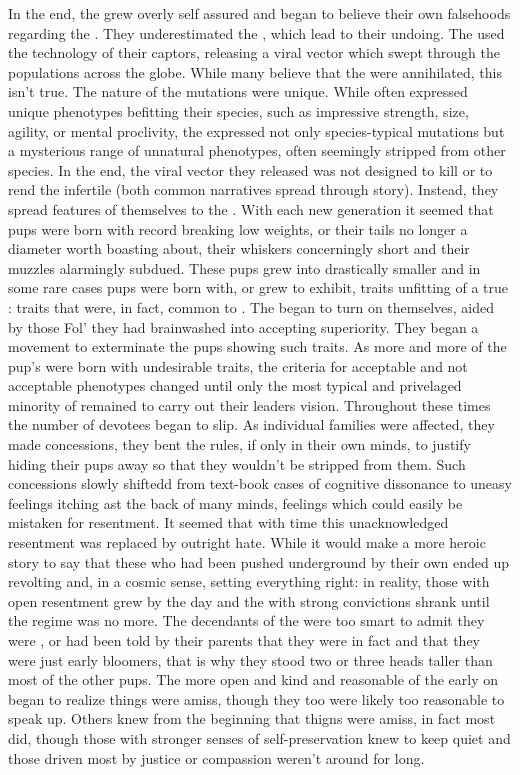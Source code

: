 \documentclass[twoside, 12pt, letterpaper]{report}\usepackage[]{graphicx}\usepackage[]{color}
\begin{document}
\begin{multicols*}{2}
In the end, the \rat grew overly self assured and began to believe their own falsehoods regarding the \mouse. They underestimated the \mouse, which lead to their undoing. The \mouse used the technology of their captors, releasing a viral vector which swept through the \rat populations across the globe. While many believe that the \rat were annihilated, this isn't true. The nature of the \mouse mutations were unique. While \rat often expressed unique phenotypes befitting their species, such as impressive strength, size, agility, or mental proclivity, the \mouse expressed not only species-typical mutations but a mysterious range of unnatural phenotypes, often seemingly stripped from other species. In the end, the viral vector they released was not designed to kill or to rend the \rat infertile (both common narratives spread through story). Instead, they spread features of themselves to the \rat. With each new generation it seemed that \rat pups were born with record breaking low weights, or their tails no longer a diameter worth boasting about, their whiskers concerningly short and their muzzles alarmingly subdued. These pups grew into drastically smaller \rat and in some rare cases \rat pups were born with, or grew to exhibit, traits unfitting of a true \rat: traits that were, in fact, common to \mouse. The \rat began to turn on themselves, aided by those Fol' they had brainwashed into accepting \rat superiority. They began a movement to exterminate the \rat pups showing such traits. As more and more of the \rat pup's were born with undesirable traits, the criteria for acceptable and not acceptable phenotypes changed until only the most typical and privelaged minority of \rat remained to carry out their leaders vision. Throughout these times the number of \rat devotees began to slip. As individual families were affected, they made concessions, they bent the rules, if only in their own minds, to justify hiding their pups away so that they wouldn't be stripped from them. Such concessions slowly shiftedd from text-book cases of cognitive dissonance to uneasy feelings itching ast the back of many \rat minds, feelings which could easily be mistaken for resentment. It seemed that with time this unacknowledged resentment was replaced by outright hate. While it would make a more heroic story to say that these \rat who had been pushed underground by their own ended up revolting and, in a cosmic sense, setting everything right: in reality, those with open resentment grew by the day and the \rat with strong convictions shrank until the \rat regime was no more. The decendants of the \rat were too smart to admit they were \rat, or had been told by their parents that they were in fact \mouse and that they were just early bloomers, that is why they stood two or three heads taller than most of the other pups. The more open and kind and reasonable of the \rat early on began to realize things were amiss, though they too were likely too reasonable to speak up. Others knew from the beginning that thigns were amiss, in fact most did, though those with stronger senses of self-preservation knew to keep quiet and those driven most by justice or compassion weren't around for long.


\end{multicols*}
\end{document}

